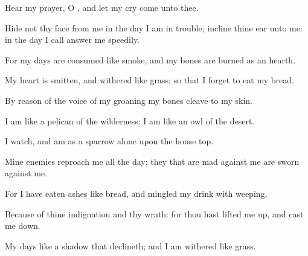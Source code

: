 {\Q {}Hear my
prayer, O
{}, and let my
cry
come unto thee.


\par }{\Q {}Hide not thy
face from me in the
day
{} I am in
trouble;
incline thine
ear unto me: in the
day
{} I
call
answer me
speedily.


\par }{\Q {}For my
days are
consumed like
smoke, and my
bones are
burned as an
hearth.


\par }{\Q {}My
heart is
smitten, and
withered like
grass; so that I
forget to
eat my
bread.


\par }{\Q {}By reason of the
voice of my
groaning my
bones
cleave to my
skin.


\par }{\Q {}I am
like a
pelican of the
wilderness: I am like an
owl of the
desert.


\par }{\Q {}I
watch, and am as a
sparrow
alone upon the house
top.


\par }{\Q {}Mine
enemies
reproach me all the
day;
{} they that are
mad against me are
sworn against me.


\par }{\Q {}For I have
eaten
ashes like
bread, and
mingled my
drink with
weeping,


\par }{\Q {}Because of thine
indignation and thy
wrath: for thou hast lifted me
up, and cast me
down.


\par }{\Q {}My
days
{} like a
shadow that
declineth; and I am
withered like
grass.


\par }{\BB \par }
